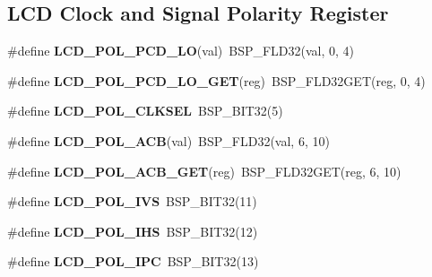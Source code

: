 \subsection*{L\+CD Clock and Signal Polarity Register}
\begin{DoxyCompactItemize}
\item 
\mbox{\label{group__lpc__lcd_ga1ec8b91a5602f4da98c85691ad4594d7}} 
\#define {\bfseries L\+C\+D\+\_\+\+P\+O\+L\+\_\+\+P\+C\+D\+\_\+\+LO}(val)~B\+S\+P\+\_\+\+F\+L\+D32(val, 0, 4)
\item 
\mbox{\label{group__lpc__lcd_ga8b496a7556a5aa439ba6c25209dbf48e}} 
\#define {\bfseries L\+C\+D\+\_\+\+P\+O\+L\+\_\+\+P\+C\+D\+\_\+\+L\+O\+\_\+\+G\+ET}(reg)~B\+S\+P\+\_\+\+F\+L\+D32\+G\+ET(reg, 0, 4)
\item 
\mbox{\label{group__lpc__lcd_gae7634686e32c7b3d54a8104554b532ce}} 
\#define {\bfseries L\+C\+D\+\_\+\+P\+O\+L\+\_\+\+C\+L\+K\+S\+EL}~B\+S\+P\+\_\+\+B\+I\+T32(5)
\item 
\mbox{\label{group__lpc__lcd_ga3e2c62c6424954fc88e1e6306ed47fa4}} 
\#define {\bfseries L\+C\+D\+\_\+\+P\+O\+L\+\_\+\+A\+CB}(val)~B\+S\+P\+\_\+\+F\+L\+D32(val, 6, 10)
\item 
\mbox{\label{group__lpc__lcd_ga1823f8bd8035bf4b525018b9dc563a4e}} 
\#define {\bfseries L\+C\+D\+\_\+\+P\+O\+L\+\_\+\+A\+C\+B\+\_\+\+G\+ET}(reg)~B\+S\+P\+\_\+\+F\+L\+D32\+G\+ET(reg, 6, 10)
\item 
\mbox{\label{group__lpc__lcd_ga07515c812c2004c0457bfc73a94a4cd3}} 
\#define {\bfseries L\+C\+D\+\_\+\+P\+O\+L\+\_\+\+I\+VS}~B\+S\+P\+\_\+\+B\+I\+T32(11)
\item 
\mbox{\label{group__lpc__lcd_ga23488a6a1c6d1440fafed13e57a71de5}} 
\#define {\bfseries L\+C\+D\+\_\+\+P\+O\+L\+\_\+\+I\+HS}~B\+S\+P\+\_\+\+B\+I\+T32(12)
\item 
\mbox{\label{group__lpc__lcd_ga966f0d367ba4562aa29ab276c0522542}} 
\#define {\bfseries L\+C\+D\+\_\+\+P\+O\+L\+\_\+\+I\+PC}~B\+S\+P\+\_\+\+B\+I\+T32(13)
\item 
\mbox{\label{group__lpc__lcd_ga59e01d8cd2a45e3bb21ed060b6f1f7f0}} 

\end{DoxyCompactItemize}
